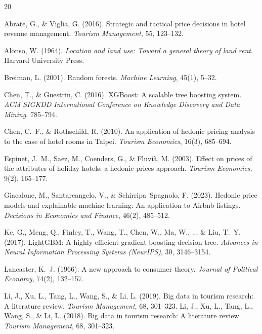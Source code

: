 \documentclass[11pt,a4paper]{article}
\begin{document}
\begin{thebibliography}{20}

Abrate, G., \& Viglia, G. (2016). Strategic and tactical price decisions in hotel revenue management. \textit{Tourism Management}, 55, 123--132.

Alonso, W. (1964). \textit{Location and land use: Toward a general theory of land rent}. Harvard University Press.

Breiman, L. (2001). Random forests. \textit{Machine Learning}, 45(1), 5--32.

Chen, T., \& Guestrin, C. (2016). XGBoost: A scalable tree boosting system. \textit{ACM SIGKDD International Conference on Knowledge Discovery and Data Mining}, 785--794.

Chen, C.~F., \& Rothschild, R. (2010). An application of hedonic pricing analysis to the case of hotel rooms in Taipei. \textit{Tourism Economics}, 16(3), 685--694.

Espinet, J.~M., Saez, M., Coenders, G., \& Fluvi{\`a}, M. (2003). Effect on prices of the attributes of holiday hotels: a hedonic prices approach. \textit{Tourism Economics}, 9(2), 165--177.

Giacalone, M., Santarcangelo, V., \& Schirripa~Spagnolo, F. (2023). Hedonic price models and explainable machine learning: An application to Airbnb listings. \textit{Decisions in Economics and Finance}, 46(2), 485--512.

Ke, G., Meng, Q., Finley, T., Wang, T., Chen, W., Ma, W., ... \& Liu, T.~Y. (2017). LightGBM: A highly efficient gradient boosting decision tree. \textit{Advances in Neural Information Processing Systems (NeurIPS)}, 30, 3146--3154.

Lancaster, K.~J. (1966). A new approach to consumer theory. \textit{Journal of Political Economy}, 74(2), 132--157.

Li, J., Xu, L., Tang, L., Wang, S., \& Li, L. (2019). Big data in tourism research: A literature review. \textit{Tourism Management}, 68, 301--323.
Li, J., Xu, L., Tang, L., Wang, S., \& Li, L. (2018). Big data in tourism research: A literature review. \textit{Tourism Management}, 68, 301--323.


\end{thebibliography}
\end{document}
